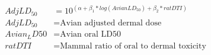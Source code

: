 \documentclass[fleqn, oneside, 11pt]{article}%
\begin{document}
\begin{preview}
\begin{align*}%
Adj LD_{50} & = 10^{\left(\alpha+\beta_{1}*log\left( Avian LD_{50}\right)+\beta_{2} * ratDTI\right)}\nonumber \\
Adj LD_{50} & =  \text{Avian adjusted dermal dose} \nonumber \\
Avian_LD{50} & =  \text{Avian oral LD50} \nonumber \\
ratDTI & =  \text{Mammal ratio of oral to dermal toxicity} \nonumber \\
\end{align*} 
\end{preview}
\end{document}
